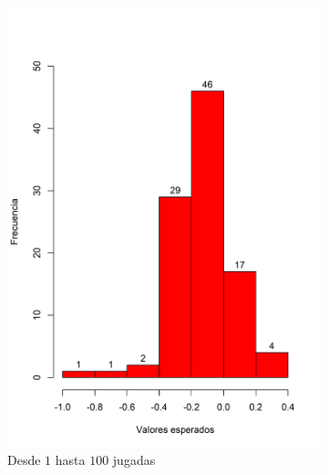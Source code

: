 \documentclass{article}
\begin{document}
\begin{figure}[h]
    \begin{center}
    \captionsetup{justification=centering}
    \begin{subfigure}[b]{0.45\textwidth}
        \includegraphics[scale=0.5]{Figures/cartas100.png}
        \caption{Desde $1$ hasta $100$ jugadas}
        \label{cartasa}
    \end{subfigure}
    \begin{subfigure}[b]{0.5\textwidth}

\end{subfigure}
\end{center}
\end{figure}
\end{document}
